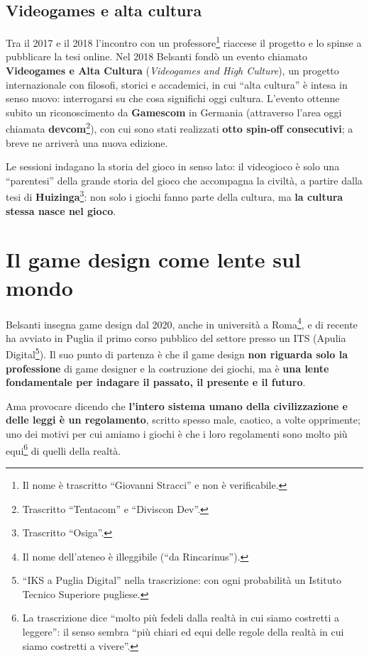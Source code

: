 \subsection{Videogames e alta cultura}

Tra il 2017 e il 2018 l'incontro con un professore\footnote{Il nome è
trascritto ``Giovanni Stracci'' e non è verificabile.} riaccese il progetto e
lo spinse a pubblicare la tesi online. Nel 2018 Belsanti fondò un evento
chiamato \textbf{Videogames e Alta Cultura} (\emph{Videogames and High Culture}),
un progetto internazionale con filosofi, storici e accademici, in cui ``alta
cultura'' è intesa in senso nuovo: interrogarsi su che cosa significhi oggi
cultura. L'evento ottenne subito un riconoscimento da \textbf{Gamescom} in
Germania (attraverso l'area oggi chiamata \textbf{devcom}\footnote{Trascritto
``Tentacom'' e ``Diviscon Dev''.}), con cui sono stati realizzati \textbf{otto
spin-off consecutivi}; a breve ne arriverà una nuova edizione.

Le sessioni indagano la storia del gioco in senso lato: il videogioco è solo una
``parentesi'' della grande storia del gioco che accompagna la civiltà, a partire
dalla tesi di \textbf{Huizinga}\footnote{Trascritto ``Osiga''.}: non solo i
giochi fanno parte della cultura, ma \textbf{la cultura stessa nasce nel gioco}.

\section{Il game design come lente sul mondo}
\label{sec:c1-2-lente}

Belsanti insegna game design dal 2020, anche in università a Roma\footnote{Il
nome dell'ateneo è illeggibile (``da Rincarinus'').}, e di recente ha avviato in
Puglia il primo corso pubblico del settore presso un ITS (Apulia
Digital\footnote{``IKS a Puglia Digital'' nella trascrizione: con ogni
probabilità un Istituto Tecnico Superiore pugliese.}). Il suo punto di partenza
è che il game design \textbf{non riguarda solo la professione} di game designer
e la costruzione dei giochi, ma è \textbf{una lente fondamentale per indagare
il passato, il presente e il futuro}.

Ama provocare dicendo che \textbf{l'intero sistema umano della civilizzazione e
delle leggi è un regolamento}, scritto spesso male, caotico, a volte opprimente;
uno dei motivi per cui amiamo i giochi è che i loro regolamenti sono molto più
equi\footnote{La trascrizione dice ``molto più fedeli dalla realtà in cui siamo
costretti a leggere'': il senso sembra ``più chiari ed equi delle regole della
realtà in cui siamo costretti a vivere''.} di quelli della realtà.

